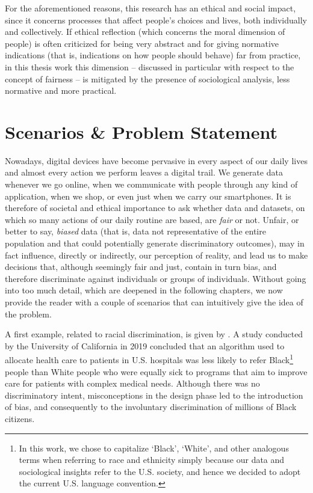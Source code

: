 For the aforementioned reasons, this research has an ethical and social impact, since it concerns processes that affect people's choices and lives, both individually and collectively. If ethical reflection (which concerns the moral dimension of people) is often criticized for being very abstract and for giving normative indications (that is, indications on how people should behave) far from practice, in this thesis work this dimension -- discussed in particular with respect to the concept of fairness -- is mitigated by the presence of sociological analysis, less normative and more practical.


\section{Scenarios \& Problem Statement}
Nowadays, digital devices have become pervasive in every aspect of our daily lives and almost every action we perform leaves a digital trail. We generate data whenever we go online, when we communicate with people through any kind of application, when we shop, or even just when we carry our smartphones. It is therefore of societal and ethical importance to ask whether data and datasets, on which so many actions of our daily routine are based, are \textit{fair} or not. Unfair, or better to say, \textit{biased} data (that is, data not representative of the entire population and that could potentially generate discriminatory outcomes), may in fact influence, directly or indirectly, our perception of reality, and lead us to make decisions that, although seemingly fair and just, contain in turn bias, and therefore discriminate against individuals or groups of individuals. Without going into too much detail, which are deepened in the following chapters, we now provide the reader with a couple of scenarios that can intuitively give the idea of the problem.

A first example, related to racial discrimination, is given by \cite{ledford2019millions}. A study conducted by the University of California in 2019 concluded that an algorithm used to allocate health care to patients in U.S. hospitals was less likely to refer Black\footnote{In this work, we chose to capitalize `Black', `White', and other analogous terms when referring to race and ethnicity simply because our data and sociological insights refer to the U.S. society, and hence we decided to adopt the current U.S. language convention.} people than White people who were equally sick to programs that aim to improve care for patients with complex medical needs. Although there was no discriminatory intent, misconceptions in the design phase led to the introduction of bias, and consequently to the involuntary discrimination of millions of Black citizens.

